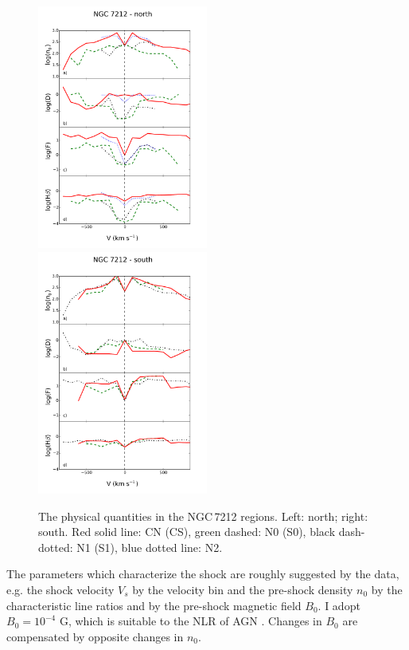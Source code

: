 \documentclass[../main.tex]{subfiles}
\begin{document}
\begin{figure}
\includegraphics[width=0.5\textwidth]{images/paper1/n72n.pdf}
\includegraphics[width=0.5\textwidth]{images/paper1/n72s.pdf}
\caption{The physical quantities in the NGC\,7212 regions. Left: north; right: south. Red solid line: CN (CS), green dashed: N0 (S0), black dash-dotted: N1 (S1), blue dotted line: N2.}
\label{fig:NGC_m}
\end{figure}


The parameters which characterize the shock are roughly suggested by the data, e.g. the  shock velocity $V_s$ by the velocity bin and the pre-shock density $n_0$ by the characteristic line ratios and by the pre-shock magnetic field $B_0$.
I adopt $B_0  = 10^{-4}$ G, which is suitable to the NLR of AGN \citep{Beck12}.
Changes in $B_0$  are compensated by opposite changes in $n_0$.
\end{document}
